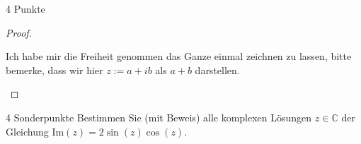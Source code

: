 \documentclass{problemset}
\begin{document}
\begin{problem}[Einheitskreis]{4 Punkte}
\begin{proof}
\begin{enumerate}
              Ich habe mir die Freiheit genommen das Ganze einmal zeichnen zu lassen, bitte
              bemerke, dass wir hier $z := a + ib$ als $a + b$ darstellen.


    \end{enumerate}
\end{proof}
\end{problem}

\begin{problem}{4 Sonderpunkte}
Bestimmen Sie (mit Beweis) alle komplexen Lösungen $z \in \mathbb{C}$ der Gleichung $\text{Im}(z) = 2\sin(z)\cos(z)$.
\end{problem}
\end{document}
